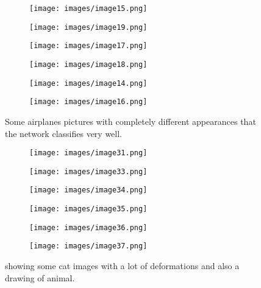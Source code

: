 \documentclass{article} \usepackage{lets_keepit_simple,times}
\begin{document}
\begin{figure}[h!]
  \centering
\begin{subfigure}[b]{0.20\linewidth}
  \texttt{[image: images/image15.png]}
\end{subfigure}
\begin{subfigure}[b]{0.20\linewidth}
  \texttt{[image: images/image19.png]}
\end{subfigure}
\begin{subfigure}[b]{0.20\linewidth}
  \texttt{[image: images/image17.png]}
\end{subfigure}

\begin{subfigure}[b]{0.20\linewidth}
  \texttt{[image: images/image18.png]}
\end{subfigure}
\begin{subfigure}[b]{0.20\linewidth}
  \texttt{[image: images/image14.png]}
\end{subfigure}
\begin{subfigure}[b]{0.20\linewidth}
  \texttt{[image: images/image16.png]}
\end{subfigure}
\caption{Some airplanes pictures with completely different appearances that the network classifies very well.}
\label{fig:fig_airplanes}
\end{figure}

\begin{figure}[h!]
  \centering
\begin{subfigure}[b]{0.20\linewidth}
  \texttt{[image: images/image31.png]}
\end{subfigure}
\begin{subfigure}[b]{0.20\linewidth}
  \texttt{[image: images/image33.png]}
\end{subfigure}
\begin{subfigure}[b]{0.20\linewidth}
  \texttt{[image: images/image34.png]}
\end{subfigure}

\begin{subfigure}[b]{0.20\linewidth}
  \texttt{[image: images/image35.png]}
\end{subfigure}
\begin{subfigure}[b]{0.20\linewidth}
  \texttt{[image: images/image36.png]}
\end{subfigure}
\begin{subfigure}[b]{0.20\linewidth}
  \texttt{[image: images/image37.png]}
\end{subfigure}
\caption{showing some cat images with a lot of deformations and also a drawing of animal.}
\label{fig:fig_cats}
\end{figure}
\end{document}

